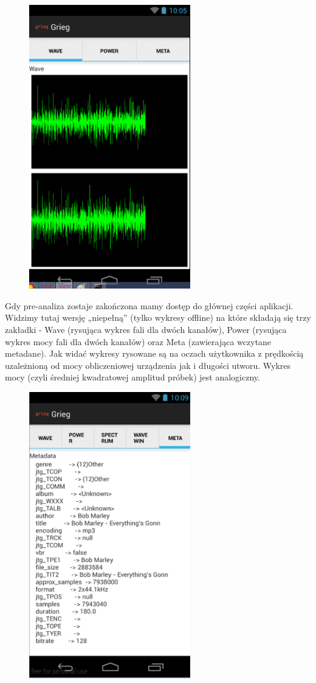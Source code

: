 \begin{figure}[H]
  \centering
  \includegraphics[width=7cm]{images/offline_wave_incomplete}
\end{figure}

Gdy pre-analiza zostaje zakończona mamy dostęp do głównej części aplikacji. Widzimy tutaj wersję
„niepełną” (tylko wykresy offline) na które składają się trzy zakładki - Wave (rysująca wykres fali
dla dwóch kanałów), Power (rysująca wykres mocy fali dla dwóch kanałów) oraz Meta (zawierająca
wczytane metadane). Jak widać wykresy rysowane są na oczach użytkownika z prędkością uzależnioną od
mocy obliczeniowej urządzenia jak i długości utworu. Wykres mocy (czyli średniej kwadratowej
amplitud próbek) jest analogiczny.

\begin{figure}[H]
  \centering
  \includegraphics[width=7cm]{images/full_metadata}
\end{figure}

